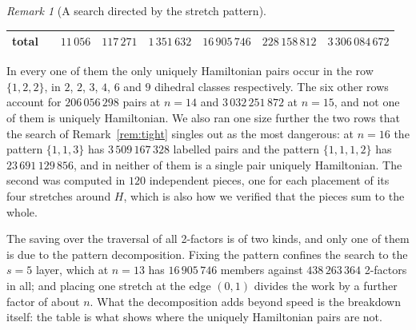 \documentclass[11pt,a4paper]{article}
\theoremstyle{definition}
\theoremstyle{remark}
\newtheorem{remark}[theorem]{Remark}
\begin{document}
\begin{remark}[A search directed by the stretch pattern]
\begin{center}
\begin{tabular}{lrrrrrrr}
\midrule
total            &          & $11\,056$ & $117\,271$ & $1\,351\,632$ & $16\,905\,746$ & $228\,158\,812$ & $3\,306\,084\,672$\\
\bottomrule
\end{tabular}
\end{center}
In every one of them the only uniquely Hamiltonian pairs occur in the row $\{1,2,2\}$, in $2$, $2$, $3$, $4$, $6$ and $9$ dihedral classes respectively. The six other rows account for $206\,056\,298$ pairs at $n=14$ and $3\,032\,251\,872$ at $n=15$, and not one of them is uniquely Hamiltonian. We also ran one size further the two rows that the search of Remark~\ref{rem:tight} singles out as the most dangerous: at $n=16$ the pattern $\{1,1,3\}$ has $3\,509\,167\,328$ labelled pairs and the pattern $\{1,1,1,2\}$ has $23\,691\,129\,856$, and in neither of them is a single pair uniquely Hamiltonian. The second was computed in $120$ independent pieces, one for each placement of its four stretches around $H$, which is also how we verified that the pieces sum to the whole.

The saving over the traversal of all 2-factors is of two kinds, and only one of them is due to the pattern decomposition. Fixing the pattern confines the search to the $s=5$ layer, which at $n=13$ has $16\,905\,746$ members against $438\,263\,364$ 2-factors in all; and placing one stretch at the edge $(0,1)$ divides the work by a further factor of about $n$. What the decomposition adds beyond speed is the breakdown itself: the table is what shows where the uniquely Hamiltonian pairs are not.
\end{remark}
\end{document}
